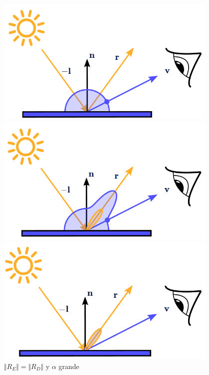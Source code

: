 \begin{figure}[!h]
     \begin{minipage}[c]{0.45\linewidth}
        \centering
        \includegraphics[width=0.95\textwidth]{Plantilla-TFG-master/img/ks0kd1.png}
        \caption{$\Vert R_E\Vert = 0$}
     \end{minipage}
     \begin{minipage}[c]{0.45\linewidth}
        \centering
        \includegraphics[width=0.95\textwidth]{Plantilla-TFG-master/img/ks1kd1.png}
        \caption{$\Vert R_E\Vert =\Vert R_D\Vert$ y $\alpha$ grande}
     \end{minipage}
     \begin{minipage}[c]{0.45\linewidth}
        \centering
        \includegraphics[width=0.95\textwidth]{Plantilla-TFG-master/img/ks1kd0.png}

\end{minipage}
\end{figure}
